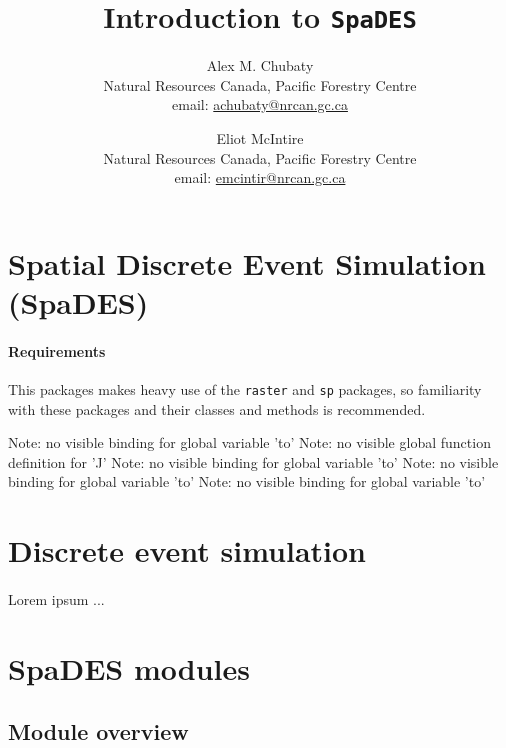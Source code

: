 \documentclass{article}
\title{Introduction to \texttt{SpaDES}}
\author{
  Alex M. Chubaty\\
	\small{Natural Resources Canada, Pacific Forestry Centre}\\
	\small{email: \href{mailto:achubaty@nrcan.gc.ca}{achubaty@nrcan.gc.ca}}
	\and
	Eliot McIntire\\
	\small{Natural Resources Canada, Pacific Forestry Centre}\\
	\small{email: \href{mailto:emcintir@nrcan.gc.ca}{emcintir@nrcan.gc.ca}}
}
\begin{document}


\maketitle

\tableofcontents

\newpage

\section{Spatial Discrete Event Simulation (SpaDES)}

\paragraph{Requirements}
This packages makes heavy use of the \texttt{raster} and \texttt{sp} packages, so familiarity with these packages and their classes and methods is recommended.

\begin{Schunk}
\begin{Soutput}
Note: no visible binding for global variable 'to' 
Note: no visible global function definition for 'J' 
Note: no visible binding for global variable 'to' 
Note: no visible binding for global variable 'to' 
Note: no visible binding for global variable 'to' 
\end{Soutput}
\end{Schunk}

\newpage

\section{Discrete event simulation}

\paragraph{}
Lorem ipsum ...

\newpage

\section{SpaDES modules}

\subsection{Module overview}
\end{document}
